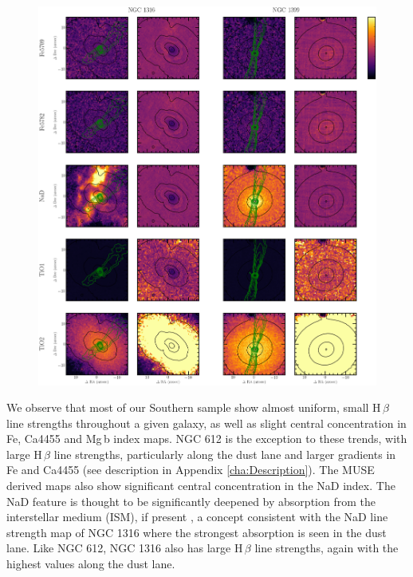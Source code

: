 		\begin{figure}
			\centering
			\includegraphics[height=0.67\textheight]{chapter4/muse/abs2b.png}
		\end{figure}

			We observe that most of our Southern sample show almost uniform, small H\,$\beta$ line strengths throughout a given galaxy, as well as slight central concentration in Fe, Ca4455 and Mg\,b index maps. NGC 612 is the exception to these trends, with large H\,$\beta$ line strengths, particularly along the dust lane and larger gradients in Fe and Ca4455 (see description in Appendix \ref{cha:Description}). The MUSE derived maps also show significant central concentration in the NaD index. The NaD feature is thought to be significantly deepened by absorption from the interstellar medium (ISM), if present \citep[e.g.][]{Phillips1993, Bergmann2009}, a concept consistent with the NaD line strength map of NGC 1316 where the strongest absorption is seen in the dust lane. Like NGC 612, NGC 1316 also has large H\,$\beta$ line strengths, again with the highest values along the dust lane. 

